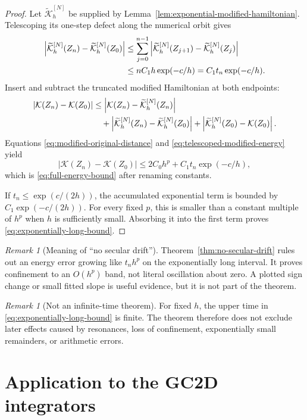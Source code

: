 \documentclass[11pt,a4paper]{article}
\theoremstyle{definition}
\theoremstyle{remark}
\newtheorem{remark}[theorem]{Remark}
\newcommand{\K}{\mathcal{K}}
\newcommand{\Kh}{\widetilde{\mathcal{K}}_h}
\newcommand{\abs}[1]{\left\lvert #1\right\rvert}
\begin{document}
\begin{proof}
Let $\Kh^{[N]}$ be supplied by
Lemma~\ref{lem:exponential-modified-hamiltonian}.  Telescoping its one-step
defect along the numerical orbit gives
\begin{align}
 \abs{\Kh^{[N]}(Z_n)-\Kh^{[N]}(Z_0)}
 &\leq
 \sum_{j=0}^{n-1}
 \abs{\Kh^{[N]}(Z_{j+1})-\Kh^{[N]}(Z_j)}
 \notag\\
 &\leq nC_1h\exp(-c/h)
 =C_1t_n\exp(-c/h).
 \label{eq:telescoped-modified-energy}
\end{align}
Insert and subtract the truncated modified Hamiltonian at both endpoints:
\begin{align}
 \abs{\K(Z_n)-\K(Z_0)}
 &\leq
 \abs{\K(Z_n)-\Kh^{[N]}(Z_n)}
 \notag\\
 &\quad+
 \abs{\Kh^{[N]}(Z_n)-\Kh^{[N]}(Z_0)}
 +\abs{\Kh^{[N]}(Z_0)-\K(Z_0)}.
 \label{eq:energy-triangle-inequality}
\end{align}
Equations \eqref{eq:modified-original-distance} and
\eqref{eq:telescoped-modified-energy} yield
\[
 \abs{\K(Z_n)-\K(Z_0)}
 \leq2C_0h^p+C_1t_n\exp(-c/h),
\]
which is \eqref{eq:full-energy-bound} after renaming constants.

If $t_n\leq\exp(c/(2h))$, the accumulated exponential term is bounded by
$C_1\exp(-c/(2h))$.  For every fixed $p$, this is smaller than a constant
multiple of $h^p$ when $h$ is sufficiently small.  Absorbing it into the
first term proves \eqref{eq:exponentially-long-bound}.
\end{proof}

\begin{remark}[Meaning of ``no secular drift'']
Theorem~\ref{thm:no-secular-drift} rules out an energy error growing like
$t_nh^p$ on the exponentially long interval.  It proves confinement to an
$O(h^p)$ band, not literal oscillation about zero.  A plotted sign change or
small fitted slope is useful evidence, but it is not part of the theorem.
\end{remark}

\begin{remark}[Not an infinite-time theorem]
For fixed $h$, the upper time in \eqref{eq:exponentially-long-bound} is finite.
The theorem therefore does not exclude later effects caused by resonances,
loss of confinement, exponentially small remainders, or arithmetic errors.
\end{remark}

\section{Application to the GC2D integrators}
\end{document}
